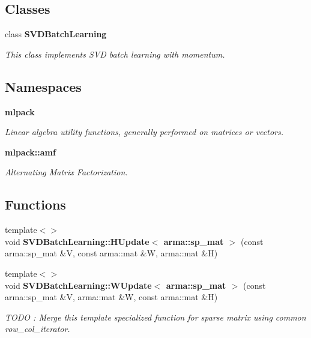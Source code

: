\subsection*{Classes}
\begin{DoxyCompactItemize}
\item 
class \textbf{ S\+V\+D\+Batch\+Learning}
\begin{DoxyCompactList}\small\item\em This class implements S\+VD batch learning with momentum. \end{DoxyCompactList}\end{DoxyCompactItemize}
\subsection*{Namespaces}
\begin{DoxyCompactItemize}
\item 
 \textbf{ mlpack}
\begin{DoxyCompactList}\small\item\em Linear algebra utility functions, generally performed on matrices or vectors. \end{DoxyCompactList}\item 
 \textbf{ mlpack\+::amf}
\begin{DoxyCompactList}\small\item\em Alternating Matrix Factorization. \end{DoxyCompactList}\end{DoxyCompactItemize}
\subsection*{Functions}
\begin{DoxyCompactItemize}
\item 
{\footnotesize template$<$$>$ }\\void \textbf{ S\+V\+D\+Batch\+Learning\+::\+H\+Update$<$ arma\+::sp\+\_\+mat $>$} (const arma\+::sp\+\_\+mat \&V, const arma\+::mat \&W, arma\+::mat \&H)
\item 
{\footnotesize template$<$$>$ }\\void \textbf{ S\+V\+D\+Batch\+Learning\+::\+W\+Update$<$ arma\+::sp\+\_\+mat $>$} (const arma\+::sp\+\_\+mat \&V, arma\+::mat \&W, const arma\+::mat \&H)
\begin{DoxyCompactList}\small\item\em T\+O\+DO \+: Merge this template specialized function for sparse matrix using common row\+\_\+col\+\_\+iterator. \end{DoxyCompactList}\end{DoxyCompactItemize}


